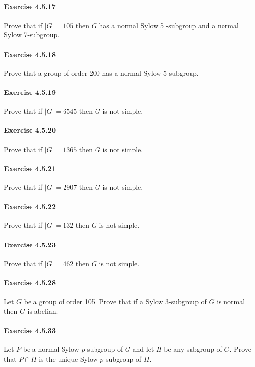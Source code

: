 \documentclass{article}
\theoremstyle{definition}
\begin{document}
\paragraph{Exercise 4.5.17} Prove that if $|G|=105$ then $G$ has a normal Sylow 5 -subgroup and a normal Sylow 7-subgroup.

\paragraph{Exercise 4.5.18} Prove that a group of order 200 has a normal Sylow 5-subgroup.

\paragraph{Exercise 4.5.19} Prove that if $|G|=6545$ then $G$ is not simple.

\paragraph{Exercise 4.5.20} Prove that if $|G|=1365$ then $G$ is not simple.

\paragraph{Exercise 4.5.21} Prove that if $|G|=2907$ then $G$ is not simple.

\paragraph{Exercise 4.5.22} Prove that if $|G|=132$ then $G$ is not simple.

\paragraph{Exercise 4.5.23} Prove that if $|G|=462$ then $G$ is not simple.

\paragraph{Exercise 4.5.28} Let $G$ be a group of order 105. Prove that if a Sylow 3-subgroup of $G$ is normal then $G$ is abelian.

\paragraph{Exercise 4.5.33} Let $P$ be a normal Sylow $p$-subgroup of $G$ and let $H$ be any subgroup of $G$. Prove that $P \cap H$ is the unique Sylow $p$-subgroup of $H$.
\end{document}

